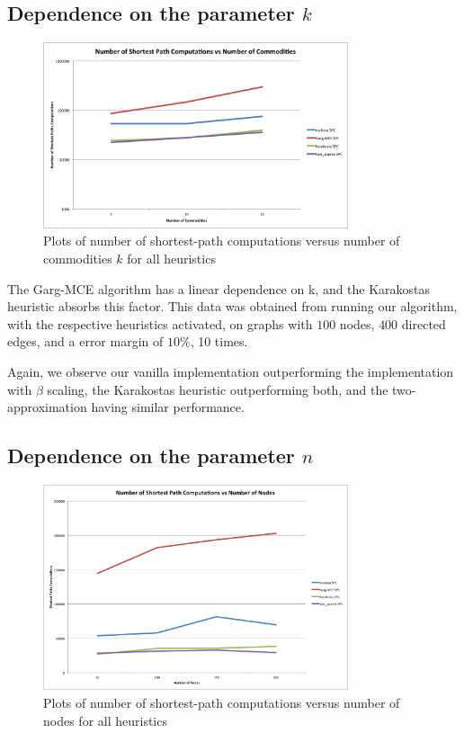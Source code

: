\subsection{Dependence on the parameter $k$}
\begin{figure}
\begin{center}
\mbox{\includegraphics[width=0.8\textwidth]{figures/commodities.png}}
\caption{Plots of number of shortest-path computations versus number
  of commodities $k$ for all heuristics}
\end{center}
\end{figure}

The Garg-MCE algorithm has a linear dependence on k, and the Karakostas heuristic absorbs this factor.
This data was obtained from running our algorithm, with the respective heuristics activated, on graphs with $100$
nodes, $400$ directed edges, and a error margin of $10\%$, 10 times.

Again, we observe our vanilla implementation outperforming the implementation with $\beta$ scaling, the Karakostas
heuristic outperforming both, and the two-approximation having similar performance.

\subsection{Dependence on the parameter $n$}
\begin{figure}
\begin{center}
\mbox{\includegraphics[width=0.8\textwidth]{figures/nodes.png}}
\caption{Plots of number of shortest-path computations versus number
  of nodes for all heuristics}
\end{center}
\end{figure}



